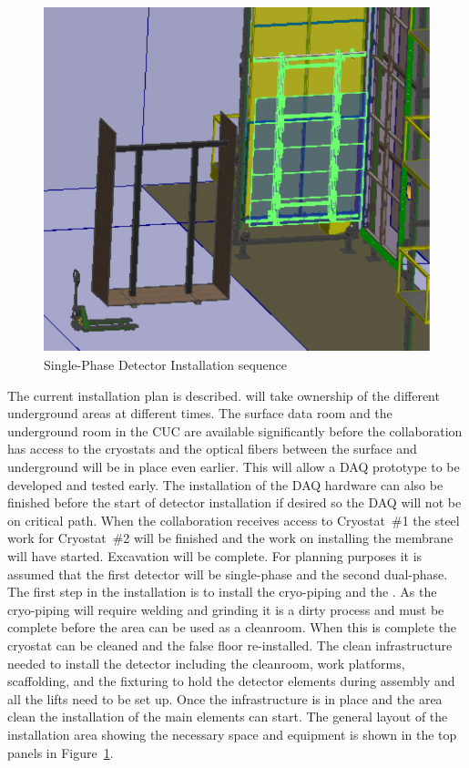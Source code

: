 \begin{figure}[!htb]
\begin{center}
\begin{minipage}[c]{0.32\textwidth}
\end{minipage}
\begin{minipage}[c]{0.32\textwidth}
\includegraphics[width=\textwidth]{far-detector-single-phase/figures/CPA-3.pdf}
\end{minipage}

\caption{Single-Phase Detector Installation sequence}
\label{Install-Seq}
\end{center}
\end{figure}

The current installation plan is described.  will take
ownership of the different underground areas at different times. The
surface data room and the underground room in the CUC are available
significantly before the collaboration has access to the cryostats and
the optical fibers between the surface and underground will be in
place even earlier. This will allow a DAQ prototype to be developed
and tested early. The installation of the DAQ hardware can also be
finished before the start of detector installation if desired so the
DAQ will not be on critical path.  When the collaboration receives
access to Cryostat~\#1 the steel work for Cryostat~\#2 will be
finished and the work on installing the membrane will have
started. Excavation will be complete.  For planning purposes it is assumed that the first detector will be single-phase and the second dual-phase. The first step in the  
installation is to install the cryo-piping and the . As the
cryo-piping will require welding and grinding it is a dirty process
and must be complete before the area can be used as a cleanroom. When
this is complete the cryostat can be cleaned and the false floor
re-installed. The clean infrastructure needed to install the detector
including the cleanroom, work platforms, scaffolding, and the
fixturing to hold the detector elements during assembly and all the
lifts need to be set up. Once the infrastructure is in place and the area
clean the installation of the main elements can start. The general
layout of the installation area showing the necessary space and
equipment is shown in the top panels in Figure~\ref{Install-Seq}.

